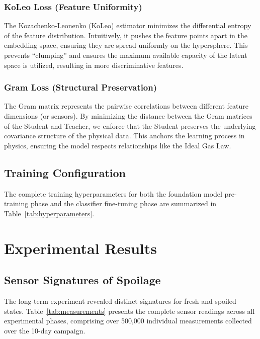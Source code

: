 \documentclass[conference]{IEEEtran}
\begin{document}
    \subsubsection{KoLeo Loss (Feature Uniformity)}
    The Kozachenko-Leonenko (KoLeo) estimator minimizes the differential entropy of the feature distribution. Intuitively, it pushes the feature points apart in the embedding space, ensuring they are spread uniformly on the hypersphere. This prevents ``clumping'' and ensures the maximum available capacity of the latent space is utilized, resulting in more discriminative features.

    \subsubsection{Gram Loss (Structural Preservation)}
    The Gram matrix represents the pairwise correlations between different feature dimensions (or sensors). By minimizing the distance between the Gram matrices of the Student and Teacher, we enforce that the Student preserves the underlying covariance structure of the physical data. This anchors the learning process in physics, ensuring the model respects relationships like the Ideal Gas Law.

    \subsection{Training Configuration}
    The complete training hyperparameters for both the foundation model pre-training phase and the classifier fine-tuning phase are summarized in Table~\ref{tab:hyperparameters}.

    

    \section{Experimental Results}

    \subsection{Sensor Signatures of Spoilage}
    The long-term experiment revealed distinct signatures for fresh and spoiled states. Table~\ref{tab:measurements} presents the complete sensor readings across all experimental phases, comprising over 500,000 individual measurements collected over the 10-day campaign.

    
\end{document}
